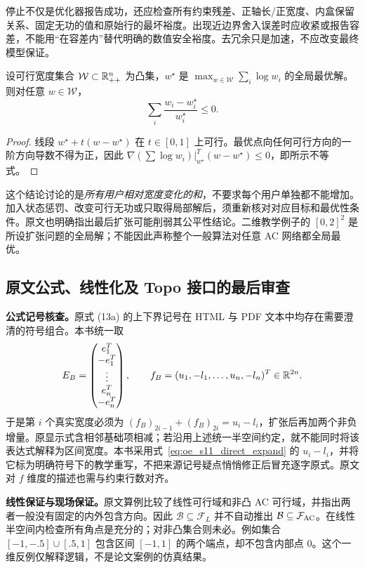 停止不仅是优化器报告成功，还应检查所有约束残差、正轴长/正宽度、内盒保留关系、固定无功的值和原始行的最坏裕度。出现近边界舍入误差时应收紧或报告容差，不能用“在容差内”替代明确的数值安全裕度。去冗余只是加速，不应改变最终模型保证。

\begin{proposition}
设可行宽度集合 $\mathcal W\subset\mathbb{R}_{++}^n$ 为凸集，$w^\star$ 是
$\max_{w\in\mathcal W}\sum_i\log w_i$ 的全局最优解。则对任意
$w\in\mathcal W$，
\begin{equation}
 \sum_i\frac{w_i-w_i^\star}{w_i^\star}\le0.
 \label{eq:oe_s11_fairness}
\end{equation}
\end{proposition}
\begin{proof}
线段 $w^\star+t(w-w^\star)$ 在 $t\in[0,1]$ 上可行。最优点向任何可行方向的一阶方向导数不得为正，因此
$\nabla(\sum\log w_i)|_{w^\star}^T(w-w^\star)\le0$，即所示不等式。
\end{proof}

这个结论讨论的是\emph{所有用户相对宽度变化的和}，不要求每个用户单独都不能增加。加入状态惩罚、改变可行无功或只取得局部解后，须重新核对对应目标和最优性条件。原文也明确指出最后扩张可能削弱其公平性结论。二维教学例子的 $[0,2]^2$ 是所设扩张问题的全局解；不能因此声称整个一般算法对任意 AC 网络都全局最优。

\subsection{原文公式、线性化及 Topo 接口的最后审查}

\textbf{公式记号核查。}原式 (13a) 的上下界记号在 HTML 与 PDF 文本中均存在需要澄清的符号组合。本书统一取
\[
 E_B=\begin{pmatrix}e_1^T\\-e_1^T\\\vdots\\e_n^T\\-e_n^T\end{pmatrix},\qquad
 f_B=(u_1,-l_1,\ldots,u_n,-l_n)^T\in\mathbb{R}^{2n}.
\]
于是第 $i$ 个真实宽度必须为 $(f_B)_{2i-1}+(f_B)_{2i}=u_i-l_i$，扩张后再加两个非负增量。原显示式含相邻基础项相减；若沿用上述统一半空间约定，就不能同时将该表达式解释为区间宽度。本书采用式~\eqref{eq:oe_s11_direct_expand} 的 $u_i-l_i$，并将它标为明确符号下的教学重写，不把来源记号疑点悄悄修正后冒充逐字原式。原文对 $f$ 维度的描述也需与约束行数对齐。

\textbf{线性保证与现场保证。}原文算例比较了线性可行域和非凸 AC 可行域，并指出两者一般没有固定的内外包含方向。因此
$\mathcal B\subseteq\mathcal F_L$ 并不自动推出
$\mathcal B\subseteq\mathcal F_{\rm AC}$。在线性半空间内检查所有角点是充分的；对非凸集合则未必。例如集合
$[-1,-.5]\cup[.5,1]$ 包含区间 $[-1,1]$ 的两个端点，却不包含内部点 0。这个一维反例仅解释逻辑，不是论文案例的仿真结果。

